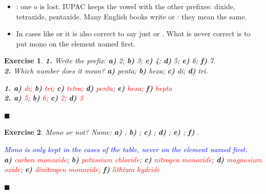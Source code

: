 \documentclass[12pt]{article}
\theoremstyle{mygreennumbox}
\newtheorem{ejercicioT}{Exercise}[section]
\newenvironment{exercise}{\begin{eBoxmygreen}\begin{ejercicioT}}{\hfill{\color{mygreen}\tiny\ensuremath{\blacksquare}}\end{ejercicioT}\end{eBoxmygreen}}
\begin{document}
\begin{marker}
    \begin{itemize}
        \item {}: one o is lost. IUPAC keeps the vowel with the other prefixes: dixide, tetraxide, pentaxide. Many English books write  or : they mean the same.
        \item In cases like  or  it is also correct to say just  or . What is never correct is to put mono on the element named first.
    \end{itemize}
\end{marker}

\begin{exercise}
    \textbf{1.} Write the prefix: \textbf{a)} 2; \textbf{b)} 3; \textbf{c)} 4; \textbf{d)} 5; \textbf{e)} 6; \textbf{f)} 7.\\
    \textbf{2.} Which number does it mean? \textbf{a)} penta; \textbf{b)} hexa; \textbf{c)} di; \textbf{d)} tri.
    \begin{solu}
        \textbf{1. a)} \textcolor{red}{di}; \textbf{b)} \textcolor{red}{tri}; \textbf{c)} \textcolor{red}{tetra}; \textbf{d)} \textcolor{red}{penta}; \textbf{e)} \textcolor{red}{hexa}; \textbf{f)} \textcolor{red}{hepta}\\
        \textbf{2. a)} \textcolor{red}{5}; \textbf{b)} \textcolor{red}{6}; \textbf{c)} \textcolor{red}{2}; \textbf{d)} \textcolor{red}{3}
    \end{solu}
\end{exercise}

\begin{exercise}
    Mono or not? Name: \textbf{a)} ; \textbf{b)} ; \textbf{c)} ; \textbf{d)} ; \textbf{e)} ; \textbf{f)} .
    \begin{solu}
        \textcolor{blue}{Mono is only kept in the cases of the table, never on the element named first.}\\
        \textbf{a)} \textcolor{red}{carbon monoxide}; \textbf{b)} \textcolor{red}{potassium chloride}; \textbf{c)} \textcolor{red}{nitrogen monoxide}; \textbf{d)} \textcolor{red}{magnesium oxide}; \textbf{e)} \textcolor{red}{dinitrogen monoxide}; \textbf{f)} \textcolor{red}{lithium hydride}
    \end{solu}
\end{exercise}
\end{document}
